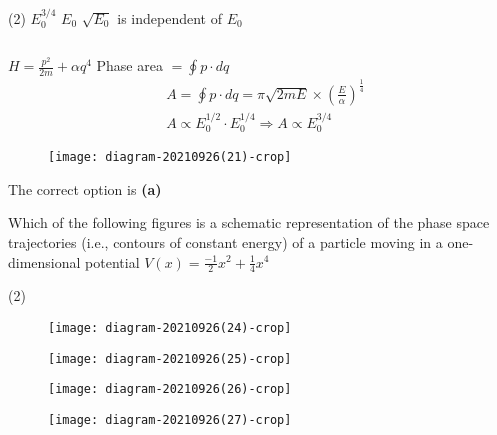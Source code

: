 \begin{enumerate}
\begin{minipage}{\textwidth}
\end{minipage}
\begin{tasks}(2)
	\task[\textbf{A.}] $E_{0}^{3 / 4}$
	\task[\textbf{B.}]$E_{0}$
	\task[\textbf{C.}]$\sqrt{E_{0}}$
	\task[\textbf{D.}]is independent of $E_{0}$
\end{tasks}
\begin{answer}$\left. \right. $\\
\begin{minipage}{0.5\textwidth}
$H=\frac{p^{2}}{2 m}+\alpha q^{4}$
Phase area $=\oint p \cdot d q$
$$
\begin{aligned}
&A=\oint p \cdot d q=\pi \sqrt{2 m E} \times\left(\frac{E}{\alpha}\right)^{\frac{1}{4}} \\
&A \propto E_{0}^{1 / 2} \cdot E_{0}^{1 / 4} \Rightarrow A \propto E_{0}^{3 / 4}
\end{aligned}
$$	
\end{minipage}
\begin{minipage}{0.5\textwidth}
	\begin{figure}[H]
		\centering
		\texttt{[image: diagram-20210926(21)-crop]}
	\end{figure}
\end{minipage}
The correct option is \textbf{(a)}	
\end{answer}
\begin{minipage}{\textwidth}
	\item Which of the following figures is a schematic representation of the phase space trajectories (i.e., contours of constant energy) of a particle moving in a one-dimensional potential $V(x)=\frac{-1}{2} x^{2}+\frac{1}{4} x^{4}$
\end{minipage}
\begin{tasks}(2)
	\task[\textbf{A.}]\begin{figure}[H]
		\centering
		\texttt{[image: diagram-20210926(24)-crop]}
	\end{figure}
	\task[\textbf{B.}]\begin{figure}[H]
		\centering
		\texttt{[image: diagram-20210926(25)-crop]}
	\end{figure}
	\task[\textbf{C.}]\begin{figure}[H]
		\centering
		\texttt{[image: diagram-20210926(26)-crop]}
	\end{figure}
	\task[\textbf{D.}]\begin{figure}[H]
		\centering
		\texttt{[image: diagram-20210926(27)-crop]}

\end{figure}
\end{tasks}
\end{enumerate}
